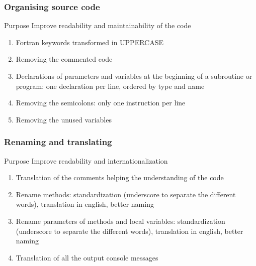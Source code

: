 \documentclass[10p]{beamer}
\begin{document}
\begin{frame}
\frametitle{Organising source code}
\begin{block}{Purpose}
Improve readability and maintainability of the code
\end{block}
\begin{enumerate}
\item Fortran keywords transformed in UPPERCASE
\item Removing the commented code
\item Declarations of parameters and variables at the beginning of a subroutine or program: one declaration per line, ordered by type and name
\item Removing the semicolons: only one instruction per line
\item Removing the unused variables
\end{enumerate}
\end{frame}
\begin{frame}
\frametitle{Renaming and translating}
\begin{block}{Purpose}
Improve readability and internationalization
\end{block}
\begin{enumerate}
\item Translation of the comments helping the understanding of the code
\item Rename methods: standardization (underscore to separate the different words), translation in english, better naming
\item Rename parameters of methods and local variables: standardization (underscore to separate the different words), translation in english, better naming
\item Translation of all the output console messages
\end{enumerate}
\end{frame}
\end{document}
